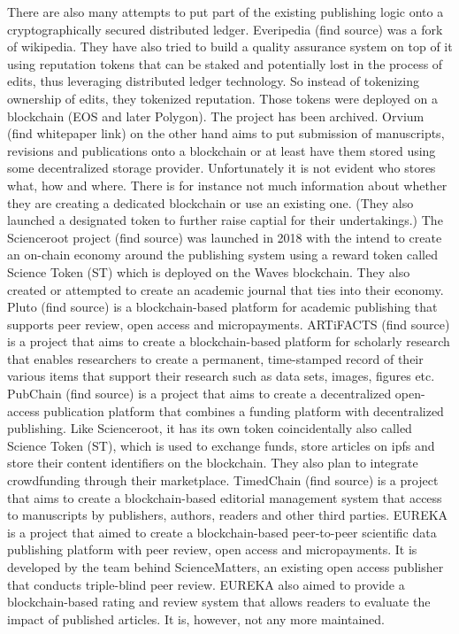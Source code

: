 \documentclass[14pt]{article}
\newcommand{\remark}[1]{{\color{purple} (#1)}}
\begin{document}
There are also many attempts to put part of the existing publishing logic onto a cryptographically secured distributed ledger. Everipedia \cite{} \remark{find source}  was a fork of wikipedia. They have also tried to build a quality assurance system on top of it using reputation tokens that can be staked and potentially lost in the process of edits, thus leveraging distributed ledger technology. So instead of tokenizing ownership of edits, they tokenized reputation. Those tokens were deployed on a blockchain (EOS and later Polygon). The project has been archived. Orvium \cite{}\remark{find whitepaper link} on the other hand aims to put submission of manuscripts, revisions and publications onto a blockchain or at least have them stored using some decentralized storage provider. Unfortunately it is not evident who stores what, how and where. There is for instance not much information about whether they are creating a dedicated blockchain or use an existing one.\remark{They also launched a designated token to further raise captial for their undertakings.} 
The Scienceroot project \cite{}\remark{find source} was launched in 2018 with the intend to create an on-chain economy around the publishing system using a reward token called Science Token (ST) which is deployed on the Waves blockchain. They also created or attempted to create an academic journal that ties into their economy. Pluto \cite{}\remark{find source} is a blockchain-based platform for academic publishing that supports peer review, open access and micropayments. ARTiFACTS \cite{}\remark{find source} is a project that aims to create a blockchain-based platform for scholarly research that enables researchers to create a permanent, time-stamped record of their various items that support their research such as data sets, images, figures etc. 
PubChain \cite{}\remark{find source} is a project that aims to create a decentralized open-access publication platform that combines a funding platform with decentralized publishing. Like Scienceroot, it has its own token coincidentally also called Science Token (ST), which is used to exchange funds, store articles on ipfs and store their content identifiers on the blockchain. They also plan to integrate crowdfunding through their marketplace. TimedChain \cite{}\remark{find source} is a project that aims to create a blockchain-based editorial management system that access to manuscripts by publishers, authors, readers and other third parties. EUREKA \cite{schaufelbuhl2019eureka} is a project that aimed to create a blockchain-based peer-to-peer scientific data publishing platform with peer review, open access and micropayments. It is developed by the team behind ScienceMatters, an existing open access publisher that conducts triple-blind peer review. EUREKA also aimed to provide a blockchain-based rating and review system that allows readers to evaluate the impact of published articles. It is, however, not any more maintained. 
\end{document}
